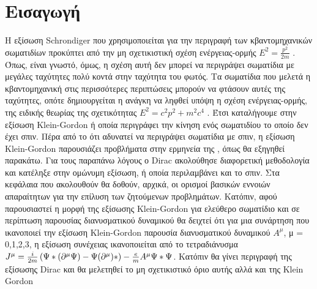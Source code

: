 \section{Εισαγωγή}

Η εξίσωση \textlatin{Schrondiger} που χρησιμοποιείται για  την περιγραφή των κβαντομηχανικών σωματιδίων προκύπτει από την μη σχετικιστική σχέση ενέργειας-ορμής $E^2=\frac{p^2}{2m}$ .  Όπως, είναι γνωστό, όμως, η σχέση αυτή δεν μπορεί να περιγράψει σωματίδια με μεγάλες ταχύτητες πολύ κοντά στην ταχύτητα του φωτός. Τα σωματίδια που μελετά η κβαντομηχανική στις περισσότερες περιπτώσεις μπορούν να φτάσουν αυτές της ταχύτητες, οπότε δημιουργείται η ανάγκη να ληφθεί υπόψη η σχέση ενέργειας-ορμής, της ειδικής θεωρίας της σχετικότητας $E^2=c^2p^2+m^2c^4$ .  Έτσι καταλήγουμε στην εξίσωση \textlatin{Klein-Gordon} ή οποία περιγράφει την κίνηση ενός σωματιδίου το οποίο δεν έχει σπιν. Πέρα από το ότι αδυνατεί να περιγράψει σωματίδια με σπιν, η εξίσωση \textlatin{Klein-Gordon} παρουσιάζει προβλήματα στην ερμηνεία της , όπως θα εξηγηθεί παρακάτω. Για τους παραπάνω λόγους ο \textlatin{Dirac} ακολούθησε διαφορετική μεθοδολογία και κατέληξε στην ομώνυμη εξίσωση, ή οποία περιλαμβάνει και το σπιν. 
Στα κεφάλαια που ακολουθούν θα δοθούν, αρχικά, οι ορισμοί βασικών εννοιών απαραίτητων για την επίλυση των ζητούμενων προβλημάτων.
Κατόπιν, αφού παρουσιαστεί η μορφή της εξίσωσης \textlatin{Klein-Gordon} για ελεύθερο σωματίδιο και σε περίπτωση παρουσίας διανυσματικού δυναμικού θα δειχτεί ότι για μια συνάρτηση που ικανοποιεί την εξίσωση \textlatin{Klein-Gordon} παρουσία διανυσματικού δυναμικού $A^\mu$, μ = 0,1,2,3, η εξίσωση συνέχειας ικανοποιείται από το τετραδιάνυσμα $J^\mu =\frac{i}{2m} \left(  \Psi* (\partial^\mu \Psi)-\Psi(\partial^\mu)* \right)  - \frac{e}{m}A^\mu \Psi* \Psi$.
Κατόπιν θα γίνει περιγραφή της εξίσωσης \textlatin{Dirac} και θα μελετηθεί το μη σχετικιστικό όριο αυτής αλλά και της \textlatin{Klein Gordon}

